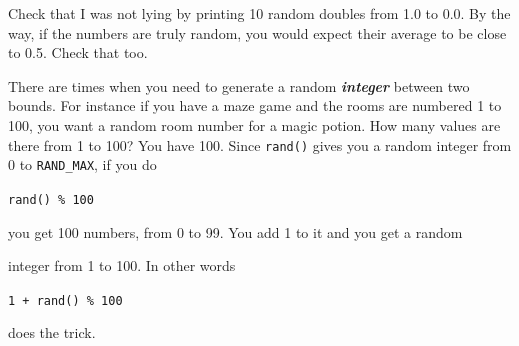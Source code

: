 Check that I was not lying by printing 10 random doubles from 1.0 to 0.0. By the way, if the numbers are truly random, you would expect their average to be close to 0.5. Check that too.



There are times when you need to generate a random \textit{\textbf{integer}} between two bounds. For instance if you have a maze game and the rooms are numbered 1 to 100, you want a random room number for a magic potion. How many values are there from 1 to 100? You have 100. Since \texttt{rand()} gives you a random integer from 0 to \texttt{RAND\_MAX}, if you do

\begin{center}

        \texttt{rand() \% 100}

\end{center}

you get 100 numbers, from 0 to 99. You add 1 to it and you get a random

integer from 1 to 100. In other words

\begin{center}

        \texttt{1 + rand() \% 100}

\end{center}



does the trick.


